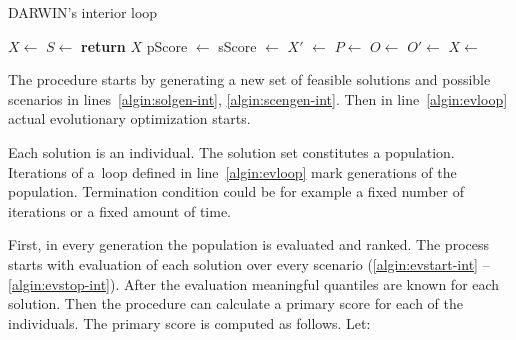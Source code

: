 \begin{algorithm}
\caption{DARWIN's interior loop}\label{alg:intloop}
  \begin{algorithmic}[1]
    \State $X \gets$  \label{algin:solgen-int}
    \State $S \gets$  \label{algin:scengen-int}
    \Loop \label{algin:evloop}
     \label{algin:evstart-int} 
    \State {}
    \EndFor{} \label{algin:evstop-int}
    \State \textbf{return} $X$
    \EndIf
    \State pScore $\gets$  \label{algin:ps}
    \State sScore $\gets$  \label{algin:ss}
    \State $X'$ $\gets$  \label{algin:rank}
    \State $P \gets$  \label{algin:select}
    \State $O \gets$  \label{algin:off}
    \State $O' \gets$  \label{algin:mut}
    \State $X \gets$  \label{algin:merge}
    \EndLoop
    \EndProcedure{}
  \end{algorithmic}
\end{algorithm}

The procedure starts by generating a new set of feasible solutions and
possible scenarios in lines~\ref{algin:solgen-int},
\ref{algin:scengen-int}. Then in line~\ref{algin:evloop} actual evolutionary
optimization starts.

Each solution is an individual. The solution set constitutes a
population. Iterations of a~loop defined in line~\ref{algin:evloop} mark
generations of the population. Termination condition could be for example a
fixed number of iterations or a fixed amount of time.

First, in every generation the population is evaluated and ranked. The process
starts with evaluation of each solution over every scenario
(\ref{algin:evstart-int} -- \ref{algin:evstop-int}). After the evaluation
meaningful quantiles are known for each solution. Then the procedure can
calculate a primary score for each of the individuals. The primary score is
computed as follows. Let:

